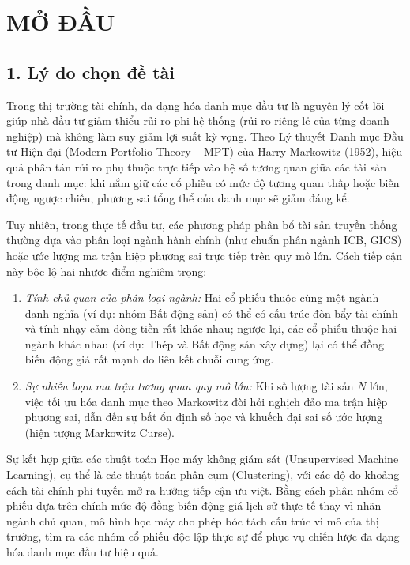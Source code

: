 \documentclass[12pt,a4paper,oneside,openany]{report}
\newcommand{\unnumberedchapter}[1]{%
  \chapter*{#1}\phantomsection\addcontentsline{toc}{chapter}{#1}\markboth{#1}{}}
\begin{document}
\clearpage
{}
\pagestyle{fancy}
\unnumberedchapter{MỞ ĐẦU}

\section*{1. Lý do chọn đề tài}
Trong thị trường tài chính, đa dạng hóa danh mục đầu tư là nguyên lý cốt lõi giúp nhà đầu tư giảm thiểu rủi ro phi hệ thống (rủi ro riêng lẻ của từng doanh nghiệp) mà không làm suy giảm lợi suất kỳ vọng. Theo Lý thuyết Danh mục Đầu tư Hiện đại (Modern Portfolio Theory -- MPT) của Harry Markowitz (1952), hiệu quả phân tán rủi ro phụ thuộc trực tiếp vào hệ số tương quan giữa các tài sản trong danh mục: khi nắm giữ các cổ phiếu có mức độ tương quan thấp hoặc biến động ngược chiều, phương sai tổng thể của danh mục sẽ giảm đáng kể.

Tuy nhiên, trong thực tế đầu tư, các phương pháp phân bổ tài sản truyền thống thường dựa vào phân loại ngành hành chính (như chuẩn phân ngành ICB, GICS) hoặc ước lượng ma trận hiệp phương sai trực tiếp trên quy mô lớn. Cách tiếp cận này bộc lộ hai nhược điểm nghiêm trọng:
\begin{enumerate}
  \item \textit{Tính chủ quan của phân loại ngành:} Hai cổ phiếu thuộc cùng một ngành danh nghĩa (ví dụ: nhóm Bất động sản) có thể có cấu trúc đòn bẩy tài chính và tính nhạy cảm dòng tiền rất khác nhau; ngược lại, các cổ phiếu thuộc hai ngành khác nhau (ví dụ: Thép và Bất động sản xây dựng) lại có thể đồng biến động giá rất mạnh do liên kết chuỗi cung ứng.
  \item \textit{Sự nhiễu loạn ma trận tương quan quy mô lớn:} Khi số lượng tài sản $N$ lớn, việc tối ưu hóa danh mục theo Markowitz đòi hỏi nghịch đảo ma trận hiệp phương sai, dẫn đến sự bất ổn định số học và khuếch đại sai số ước lượng (hiện tượng Markowitz Curse).
\end{enumerate}

Sự kết hợp giữa các thuật toán Học máy không giám sát (Unsupervised Machine Learning), cụ thể là các thuật toán phân cụm (Clustering), với các độ đo khoảng cách tài chính phi tuyến mở ra hướng tiếp cận ưu việt. Bằng cách phân nhóm cổ phiếu dựa trên chính mức độ đồng biến động giá lịch sử thực tế thay vì nhãn ngành chủ quan, mô hình học máy cho phép bóc tách cấu trúc vi mô của thị trường, tìm ra các nhóm cổ phiếu độc lập thực sự để phục vụ chiến lược đa dạng hóa danh mục đầu tư hiệu quả.
\end{document}

